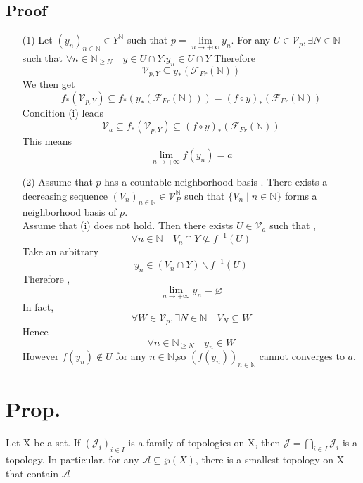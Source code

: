 \documentclass{book}
\begin{document}
\subsection*{Proof}
\begin{itemize}
    \item [(1)]Let $(y_n)_{n\in \mathbb{N} }\in Y^\mathbb{N} $ such that $p=\lim\limits_{n\rightarrow +\infty}y_n$. For any $U\in\mathcal{V}_p,\exists N\in \mathbb{N} $ such that $\forall n\in \mathbb{N} _{\geq N}\quad y\in U\cap Y$.$y_n\in U\cap Y$ Therefore $$\mathcal{V}_{p,Y}\subseteq y_*(\mathcal{F}_{Fr}(\mathbb{N} ))$$We then get $$f_*(\mathcal{V}_{p,Y})\subseteq f_*(y_*(\mathcal{F}_{Fr}(\mathbb{N} )))=(f\circ y)_*(\mathcal{F}_{Fr}(\mathbb{N} ))$$ Condition (i) leads$$\mathcal{V}_a\subseteq f_*(\mathcal{V}_{p,Y})\subseteq (f\circ y)_*(\mathcal{F}_{Fr}(\mathbb{N} ))$$This means $$\lim\limits_{n\rightarrow+\infty}f(y_n)=a$$
    \item [(2)]Assume that $p$ has a  countable neighborhood basis . There exists a decreasing sequence $(V_n)_{n\in \mathbb{N} }\in \mathcal{V}_P^\mathbb{N} $ such that $\{V_n\mid n\in \mathbb{N} \}$ forms a neighborhood basis of $p$.\\Assume that (i) does not hold. Then there exists $U\in \mathcal{V}_a$ such that , $$\forall n\in \mathbb{N} \quad V_n\cap Y\not\subseteq f^{-1}(U)$$Take an arbitrary $$y_n\in(V_n\cap Y)\backslash f^{-1}(U)$$Therefore ,$$\lim\limits_{n\rightarrow +\infty}y_n=\varnothing$$In fact, $$\forall W\in \mathcal{V}_p,\exists N\in \mathbb{N} \quad V_N\subseteq W$$Hence $$\forall n\in \mathbb{N} _{\geq N}\quad y_n\in W$$ However $f(y_n)\not\in U$ for any $n\in \mathbb{N} $,so $(f(y_n))_{n\in \mathbb{N} }$ cannot converges to $a$.
\end{itemize}
\section{Prop.}
Let X be a set. If $(\mathcal{J}_i)_{i\in I}$ is a family of topologies on X, then $\mathcal{J}=\bigcap\limits_{i\in I}\mathcal{J}_i$ is a topology. In particular. for any $\mathcal{A}\subseteq \wp(X)$, there is a smallest topology on X that contain $\mathcal{A}$
\end{document}
